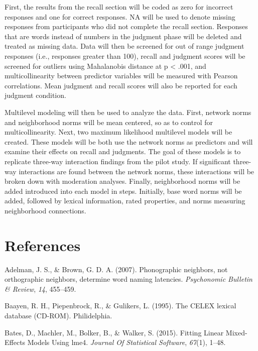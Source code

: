 \documentclass[english,man]{apa6}
\theoremstyle{definition}
\theoremstyle{definition}
\theoremstyle{remark}
\begin{document}
First, the results from the recall section will be coded as zero for
incorrect responses and one for correct responses. NA will be used to
denote missing responses from participants who did not complete the
recall section. Responses that are words instead of numbers in the
judgment phase will be deleted and treated as missing data. Data will
then be screened for out of range judgment responses (i.e., responses
greater than 100), recall and judgment scores will be screened for
outliers using Mahalanobis distance at p \textless{} .001, and
multicollinearity between predictor variables will be measured with
Pearson correlations. Mean judgment and recall scores will also be
reported for each judgment condition.

Multilevel modeling will then be used to analyze the data. First,
network norms and neighborhood norms will be mean centered, so as to
control for multicollinearity. Next, two maximum likelihood multilevel
models will be created. These models will be both use the network norms
as predictors and will examine their effects on recall and judgments.
The goal of these models is to replicate three-way interaction findings
from the pilot study. If significant three-way interactions are found
between the network norms, these interactions will be broken down with
moderation analyses. Finally, neighborhood norms will be added
introduced into each model in steps. Initially, base word norms will be
added, followed by lexical information, rated properties, and norms
measuring neighborhood connections.

\newpage

\section{References}\label{references}

\setlength{\parindent}{-0.5in} \setlength{\leftskip}{0.5in}

\hypertarget{refs}{}
\hypertarget{ref-Adelman2007}{}
Adelman, J. S., \& Brown, G. D. A. (2007). Phonographic neighbors, not
orthographic neighbors, determine word naming latencies.
\emph{Psychonomic Bulletin \& Review}, \emph{14}, 455--459.

\hypertarget{ref-Baayen1995}{}
Baayen, R. H., Piepenbrock, R., \& Gulikers, L. (1995). The CELEX
lexical database (CD-ROM). Philidelphia.

\hypertarget{ref-Bates2015}{}
Bates, D., Machler, M., Bolker, B., \& Walker, S. (2015). Fitting Linear
Mixed-Effects Models Using lme4. \emph{Journal Of Statistical Software},
\emph{67}(1), 1--48.
\end{document}
